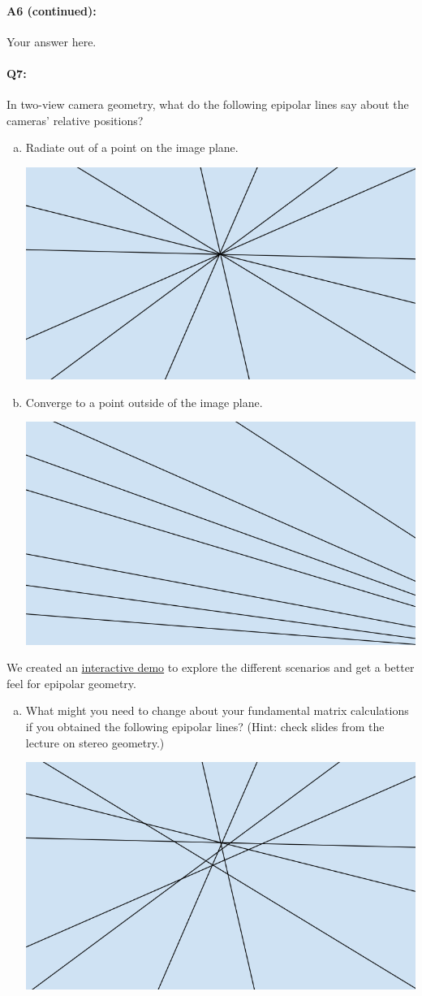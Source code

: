 
\pagebreak
\paragraph{A6 (continued):} Your answer here.




\pagebreak
\paragraph{Q7:} In two-view camera geometry, what do the following epipolar lines say about the cameras' relative positions?
\begin{enumerate}[(a)]
\item Radiate out of a point on the image plane.

\includegraphics[width = 0.25\linewidth]{epipolarlines-a.PNG}
\item Converge to a point outside of the image plane.

\includegraphics[width = 0.25\linewidth]{epipolarlines-b.PNG}
\end{enumerate}

We created an \href{https://browncsci1430.github.io/webpage/demos/stereo_camera_visualization/index.html}{interactive demo} to explore the different scenarios and get a better feel for epipolar geometry.
\begin{enumerate}[(c)]
\item What might you need to change about your fundamental matrix calculations if you obtained the following epipolar lines? (Hint: check slides from the lecture on stereo geometry.)

\includegraphics[width = 0.25\linewidth]{epipolarlines-c.PNG}
\end{enumerate}


